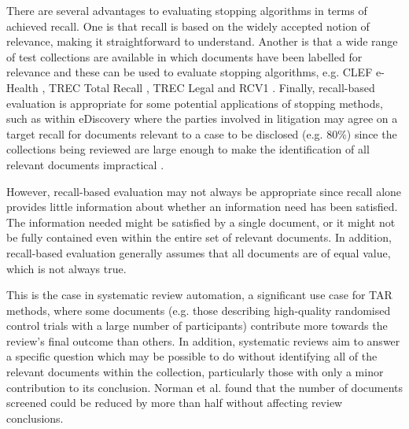 \documentclass[sigconf,natbib=true,anonymous=true]{acmart}
\begin{document}
There are several advantages to evaluating stopping algorithms in terms of achieved recall. One is that recall is based on the widely accepted notion of relevance, making it straightforward to understand. Another is that a wide range of test collections are available in which documents have been labelled for relevance and these can be used to evaluate stopping algorithms, e.g. CLEF e-Health \cite{kanoulas2017clef, kanoulas2018clef,kanoulas2019clef}, TREC Total Recall \cite{grossman2016trec}, TREC Legal \cite{cormack2010overview} and RCV1 \cite{lewis2004rcv1}. Finally, recall-based evaluation is appropriate for some potential applications of stopping methods, such as within eDiscovery where the parties involved in litigation may agree on a target recall for documents relevant to a case to be disclosed (e.g. 80\%) since the collections being reviewed are large enough to make the identification of all relevant documents impractical \cite{yang2021minimizing}. 

However, recall-based evaluation may not always be appropriate since recall alone provides little information about whether an information need has been satisfied. The information needed might be satisfied by a single document, or it might not be fully contained even within the entire set of relevant documents. In addition, recall-based evaluation generally assumes that all documents are of equal value, which is not always true. 

This is the case in systematic review automation, a significant use case for TAR methods, where some documents (e.g. those describing high-quality randomised control trials with a large number of participants) contribute more towards the review's final outcome than others. In addition, systematic reviews aim to answer a specific question which may be possible to do without identifying all of the relevant documents within the collection, particularly those with only a minor contribution to its conclusion. Norman et al. \cite{norman2019measuring} found that the number of documents screened could be reduced by more than half without affecting review conclusions. 
\end{document}
